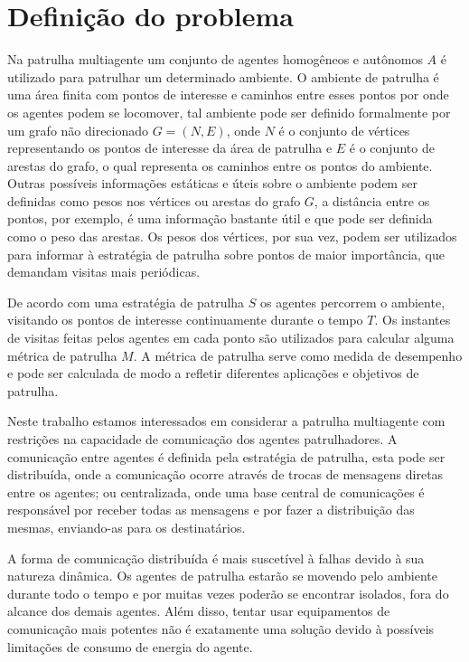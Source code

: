 \chapter{Definição do problema}
\label{chp:problem}

Na patrulha multiagente um conjunto de agentes homogêneos e autônomos $A$ é 
utilizado para patrulhar um determinado ambiente. O ambiente de patrulha é uma 
área finita com pontos de interesse e caminhos entre esses pontos por onde os 
agentes podem se locomover, tal ambiente pode ser definido formalmente por um 
grafo não direcionado $G = (N, E)$, onde $N$ é o conjunto de vértices 
representando os pontos de interesse da área de patrulha e $E$ é o conjunto de 
arestas do grafo, o qual representa os caminhos entre os pontos do ambiente. 
Outras possíveis informações estáticas e úteis sobre o ambiente podem ser 
definidas como pesos nos vértices ou arestas do grafo $G$, a distância entre os 
pontos, por exemplo, é uma informação bastante útil e que pode ser definida como 
o peso das arestas. Os pesos dos vértices, por sua vez, podem ser utilizados 
para informar à estratégia de patrulha sobre pontos de maior importância, que 
demandam visitas mais periódicas. 

De acordo com uma estratégia de patrulha $S$ os agentes percorrem o ambiente, 
visitando os pontos de interesse continuamente durante o tempo $T$. Os instantes 
de visitas feitas pelos agentes em cada ponto são utilizados para calcular 
alguma métrica de patrulha $M$. A métrica de patrulha serve como medida de 
desempenho e pode ser calculada de modo a refletir diferentes aplicações e 
objetivos de patrulha.

Neste trabalho estamos interessados em considerar a patrulha multiagente com 
restrições na capacidade de comunicação dos agentes patrulhadores. A comunicação 
entre agentes é definida pela estratégia de patrulha, esta pode ser distribuída, 
onde a comunicação ocorre através de trocas de mensagens diretas entre os 
agentes; ou centralizada, onde uma base central de comunicações é responsável 
por receber todas as mensagens e por fazer a distribuição das mesmas, 
enviando-as para os destinatários. 

A forma de comunicação distribuída é mais suscetível à falhas devido à sua 
natureza dinâmica. Os agentes de patrulha estarão se movendo pelo ambiente 
durante todo o tempo e por muitas vezes poderão se encontrar isolados, fora do 
alcance dos demais agentes. Além disso, tentar usar equipamentos de comunicação 
mais potentes não é exatamente uma solução devido à possíveis limitações de 
consumo de energia do agente. 

